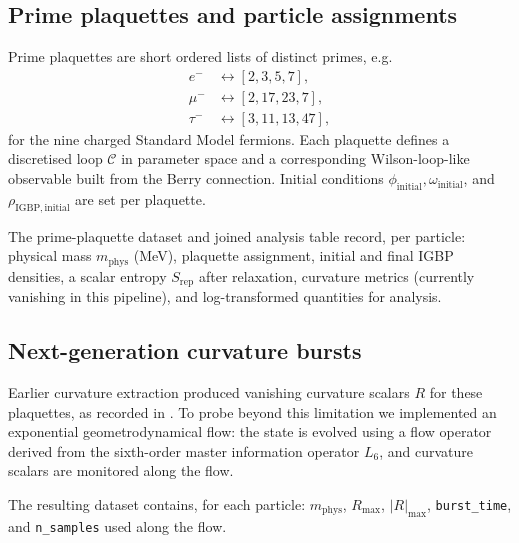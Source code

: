 \documentclass[12pt]{article}
\begin{document}
\subsection{Prime plaquettes and particle assignments}
Prime plaquettes are short ordered lists of distinct primes, e.g.
\begin{align*}
    e^- &\leftrightarrow [2,3,5,7],\\
    \mu^- &\leftrightarrow [2,17,23,7],\\
    \tau^- &\leftrightarrow [3,11,13,47],
\end{align*}
for the nine charged Standard Model fermions. Each plaquette defines a discretised loop $\mathcal{C}$ in parameter space and a corresponding Wilson-loop-like observable built from the Berry connection. Initial conditions $\phi_{\mathrm{initial}}, \omega_{\mathrm{initial}}$, and $\rho_{\mathrm{IGBP, initial}}$ are set per plaquette.

The prime-plaquette dataset \cite{plaquette-scan-20251130} and joined analysis table \cite{joint-analysis-20251130} record, per particle: physical mass $m_{\mathrm{phys}}$ (MeV), plaquette assignment, initial and final IGBP densities, a scalar entropy $S_{\mathrm{rep}}$ after relaxation, curvature metrics (currently vanishing in this pipeline), and log-transformed quantities for analysis.

\subsection{Next-generation curvature bursts}
Earlier curvature extraction produced vanishing curvature scalars $R$ for these plaquettes, as recorded in \cite{curvature-metrics-20251130}. To probe beyond this limitation we implemented an exponential geometrodynamical flow: the state is evolved using a flow operator derived from the sixth-order master information operator $L_6$, and curvature scalars are monitored along the flow.

The resulting dataset \cite{nextgen-curvature-exponential-20251201} contains, for each particle: $m_{\mathrm{phys}}$, $R_{\max}$, $\lvert R\rvert_{\max}$, \texttt{burst\_time}, and \texttt{n\_samples} used along the flow.
\end{document}

